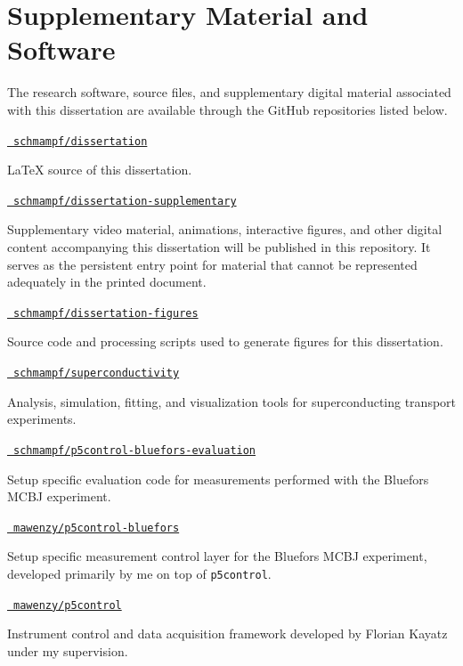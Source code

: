 
\chapter{Supplementary Material and Software}
\label{appendix:software-supplementary}

The research software, source files, and supplementary digital material associated with this dissertation are available through the GitHub repositories listed below.

\medskip
\noindent\href{https://github.com/schmampf/dissertation}{\githubicon\ \texttt{schmampf/dissertation}}\par
\noindent LaTeX source of this dissertation.

\medskip
\noindent\href{https://github.com/schmampf/dissertation-supplementary}{\githubicon\ \texttt{schmampf/dissertation-supplementary}}\par
\noindent Supplementary video material, animations, interactive figures, and other digital content accompanying this dissertation will be published in this repository. It serves as the persistent entry point for material that cannot be represented adequately in the printed document.

\medskip
\noindent\href{https://github.com/schmampf/dissertation-figures}{\githubicon\ \texttt{schmampf/dissertation-figures}}\par
\noindent Source code and processing scripts used to generate figures for this dissertation.

\medskip
\noindent\href{https://github.com/schmampf/superconductivity}{\githubicon\ \texttt{schmampf/superconductivity}}\par
\noindent Analysis, simulation, fitting, and visualization tools for superconducting transport experiments.

\medskip
\noindent\href{https://github.com/schmampf/p5control-bluefors-evaluation}{\githubicon\ \texttt{schmampf/p5control-bluefors-evaluation}}\par
\noindent Setup specific evaluation code for measurements performed with the Bluefors MCBJ experiment.

\medskip
\noindent\href{https://github.com/mawenzy/p5control-bluefors}{\githubicon\ \texttt{mawenzy/p5control-bluefors}}\par
\noindent Setup specific measurement control layer for the Bluefors MCBJ experiment, developed primarily by me on top of \texttt{p5control}.

\medskip
\noindent\href{https://github.com/mawenzy/p5control}{\githubicon\ \texttt{mawenzy/p5control}}\par
\noindent Instrument control and data acquisition framework developed by Florian Kayatz under my supervision.
